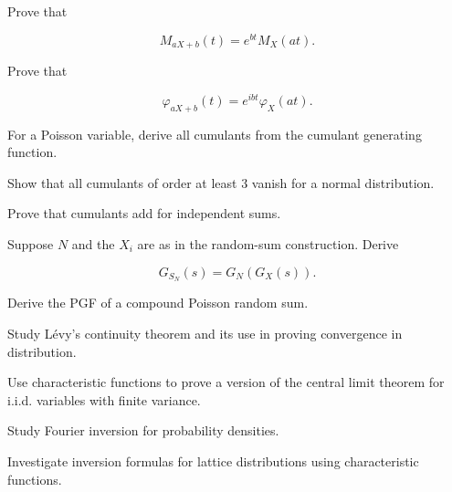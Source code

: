 \begin{exercise}[3]
Prove that

\[
M_{aX+b}(t)
=
e^{bt}M_X(at).
\]
\end{exercise}

\begin{exercise}[3]
Prove that

\[
\varphi_{aX+b}(t)
=
e^{ibt}\varphi_X(at).
\]
\end{exercise}

\begin{exercise}[3]
For a Poisson variable, derive all cumulants from the cumulant generating
function.
\end{exercise}

\begin{exercise}[3]
Show that all cumulants of order at least \(3\) vanish for a normal
distribution.
\end{exercise}

\begin{exercise}[3]
Prove that cumulants add for independent sums.
\end{exercise}

\begin{exercise}[3]
Suppose \(N\) and the \(X_i\) are as in the random-sum construction.
Derive

\[
G_{S_N}(s)
=
G_N(G_X(s)).
\]
\end{exercise}

\begin{exercise}[3]
Derive the PGF of a compound Poisson random sum.
\end{exercise}

\begin{exercise}[4]
Study Lévy's continuity theorem and its use in proving convergence in
distribution.
\end{exercise}

\begin{exercise}[4]
Use characteristic functions to prove a version of the central limit
theorem for i.i.d. variables with finite variance.
\end{exercise}

\begin{exercise}[4]
Study Fourier inversion for probability densities.
\end{exercise}

\begin{exercise}[4]
Investigate inversion formulas for lattice distributions using
characteristic functions.
\end{exercise}

